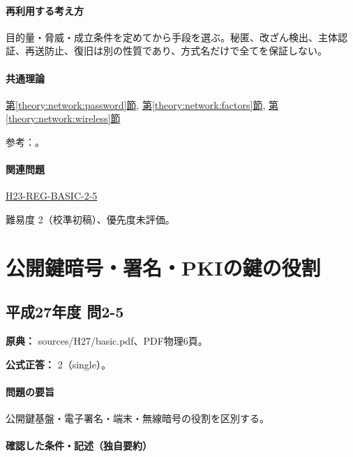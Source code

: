 \paragraph{再利用する考え方} 目的量・脅威・成立条件を定めてから手段を選ぶ。秘匿、改ざん検出、主体認証、再送防止、復旧は別の性質であり、方式名だけで全てを保証しない。

\paragraph{共通理論} \hyperref[theory:network:password]{第\ref*{theory:network:password}節}, \hyperref[theory:network:factors]{第\ref*{theory:network:factors}節}, \hyperref[theory:network:wireless]{第\ref*{theory:network:wireless}節}

\par 参考：\cite{net_nist2017,net_nist2025,net_wep}。

\paragraph{関連問題} \hyperref[q:h23-reg-basic-2-5]{H23-REG-BASIC-2-5}

\par 難易度 2（校準初稿）、優先度未評価。

\section{公開鍵暗号・署名・PKIの鍵の役割}

\subsection{平成27年度 問2-5}
\label{q:h27-reg-basic-2-5}

\noindent\textbf{原典：} sources/H27/basic.pdf、PDF物理6頁。

\textbf{公式正答：} 2（single）。

\paragraph{問題の要旨} 公開鍵基盤・電子署名・端末・無線暗号の役割を区別する。

\paragraph{確認した条件・記述（独自要約）}\mbox{}\par

